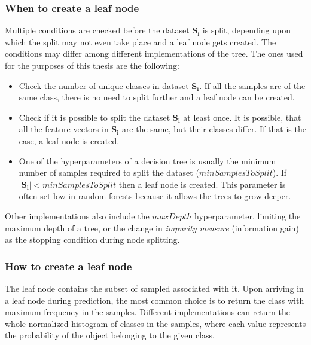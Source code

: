 \documentclass[11pt]{article}
\begin{document}
      \subsubsection{When to create a leaf node}
        Multiple conditions are checked before the dataset $\mathbf{S_i}$ is split, depending upon which the split may not even take place and a leaf node gets created. The conditions may differ among different implementations of the tree. The ones used for the purposes of this thesis are the following:
        \begin{itemize}
          \item Check the number of unique classes in dataset $\mathbf{S_i}$. If all the samples are of the same class, there is no need to split further and a leaf node can be created.\cite{brabec}
          \item Check if it is possible to split the dataset $\mathbf{S_i}$ at least once. It is possible, that all the feature vectors in $\mathbf{S_i}$ are the same, but their classes differ. If that is the case, a leaf node is created.\cite{brabec}
          \item One of the hyperparameters of a decision tree is usually the minimum number of samples required to split the dataset ($minSamplesToSplit$). If $|\mathbf{S_i}| < minSamplesToSplit$ then a leaf node is created. This parameter is often set low in random forests because it allows the trees to grow deeper.\cite{brabec}
        \end{itemize}
        Other implementations also include the $maxDepth$ hyperparameter, limiting the maximum depth of a tree, or the change in {\it impurity measure} (information gain) as the stopping condition during node splitting.\cite{brabec}
      \subsubsection{How to create a leaf node}
        The leaf node contains the subset of sampled associated with it. Upon arriving in a leaf node during prediction, the most common choice is to return the class with maximum frequency in the samples. Different implementations can return the whole normalized histogram of classes in the samples, where each value represents the probability of the object belonging to the given class.
\end{document}
